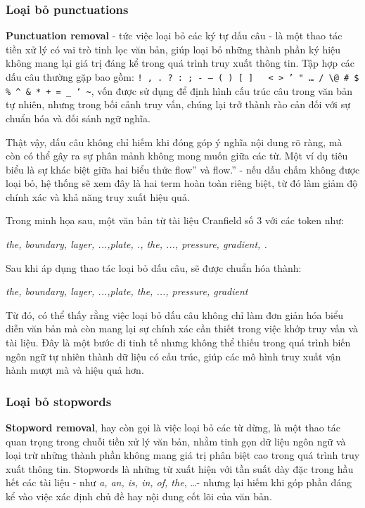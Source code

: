 \subsubsection{Loại bỏ punctuations}
\textbf{Punctuation removal} - tức việc loại bỏ các ký tự dấu câu - là một thao tác tiền xử lý có vai trò tinh lọc văn bản, giúp loại bỏ những thành phần ký hiệu không mang lại giá trị đáng kể trong quá trình truy xuất thông tin. Tập hợp các dấu câu thường gặp bao gồm: \texttt{! , . ? : ; - — ( ) [ ] { } < > ' " … / \textbackslash @ \# \$ \% \^{} \& * + = \_ ` \textasciitilde}, vốn được sử dụng để định hình cấu trúc câu trong văn bản tự nhiên, nhưng trong bối cảnh truy vấn, chúng lại trở thành rào cản đối với sự chuẩn hóa và đối sánh ngữ nghĩa.

Thật vậy, dấu câu không chỉ hiếm khi đóng góp ý nghĩa nội dung rõ ràng, mà còn có thể gây ra sự phân mảnh không mong muốn giữa các từ. Một ví dụ tiêu biểu là sự khác biệt giữa hai biểu thức flow'' và flow.'' - nếu dấu chấm không được loại bỏ, hệ thống sẽ xem đây là hai term hoàn toàn riêng biệt, từ đó làm giảm độ chính xác và khả năng truy xuất hiệu quả.

Trong minh họa sau, một văn bản từ tài liệu Cranfield số 3 với các token như:
\begin{center}
    \textit{the, boundary, layer, ...,plate, ., the, ..., pressure, gradient, .}
\end{center}

Sau khi áp dụng thao tác loại bỏ dấu câu, sẽ được chuẩn hóa thành:
\begin{center}
    \textit{the, boundary, layer, ...,plate, the, ..., pressure, gradient}
\end{center}

Từ đó, có thể thấy rằng việc loại bỏ dấu câu không chỉ làm đơn giản hóa biểu diễn văn bản mà còn mang lại sự chính xác cần thiết trong việc khớp truy vấn và tài liệu. Đây là một bước đi tinh tế nhưng không thể thiếu trong quá trình biến ngôn ngữ tự nhiên thành dữ liệu có cấu trúc, giúp các mô hình truy xuất vận hành mượt mà và hiệu quả hơn.

\subsubsection{Loại bỏ stopwords}
\textbf{Stopword removal}, hay còn gọi là việc loại bỏ các từ dừng, là một thao tác quan trọng trong chuỗi tiền xử lý văn bản, nhằm tinh gọn dữ liệu ngôn ngữ và loại trừ những thành phần không mang giá trị phân biệt cao trong quá trình truy xuất thông tin. Stopwords là những từ xuất hiện với tần suất dày đặc trong hầu hết các tài liệu - như \textit{a, an, is, in, of, the}, \dots - nhưng lại hiếm khi góp phần đáng kể vào việc xác định chủ đề hay nội dung cốt lõi của văn bản.

